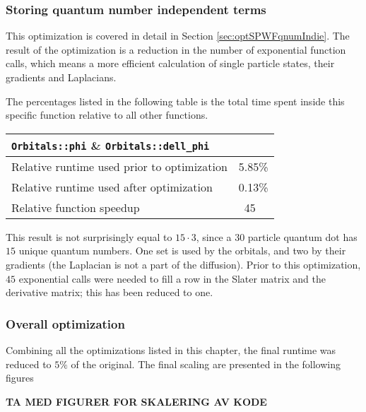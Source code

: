 \subsubsection{Storing quantum number independent terms}

This optimization is covered in detail in Section \ref{sec:optSPWFqnumIndie}. The result of the optimization is a reduction in the number of exponential function calls, which means a more efficient calculation of single particle states, their gradients and Laplacians.

The percentages listed in the following table is the total time spent inside this specific function relative to all other functions. 

\begin{tabular}{ll}
 \verb+Orbitals::phi+ \& \verb+Orbitals::dell_phi+ & \\
 \hline\hline
 Relative runtime used prior to optimization & 5.85\% \\
 Relative runtime used after optimization    & 0.13\% \\
 \hline
 Relative function speedup                   & ~45
\end{tabular}

This result is not surprisingly equal to $15\cdot 3$, since a $30$ particle quantum dot has $15$ unique quantum numbers. One set is used by the orbitals, and two by their gradients (the Laplacian is not a part of the diffusion). Prior to this optimization, $45$ exponential calls were needed to fill a row in the Slater matrix and the derivative matrix; this has been reduced to one.

\subsubsection{Overall optimization}

Combining all the optimizations listed in this chapter, the final runtime was reduced to $5\%$ of the original. The final scaling are presented in the following figures

\textbf{TA MED FIGURER FOR SKALERING AV KODE}